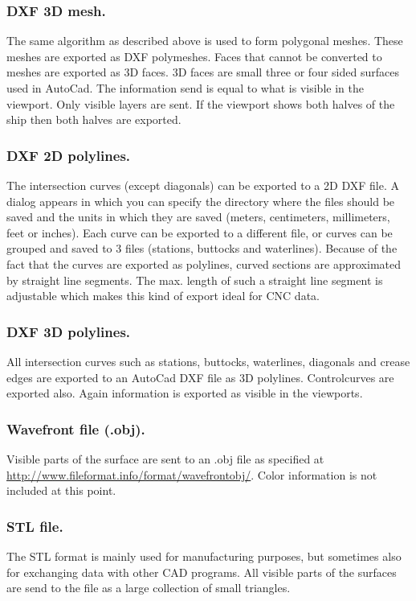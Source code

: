 \documentclass[12pt]{article}
\begin{document}
\subsubsection{DXF 3D mesh.}
The same algorithm as described above is used to form polygonal meshes. These meshes are
exported as DXF polymeshes. Faces that cannot be converted to meshes are exported as 3D
faces. 3D faces are small three or four sided surfaces used in AutoCad. The information send is
equal to what is visible in the viewport. Only visible layers are sent. If the viewport shows both
halves of the ship then both halves are exported.

\subsubsection{DXF 2D polylines.}
The intersection curves (except diagonals) can be exported to a 2D DXF file. A dialog appears in
which you can specify the directory where the files should be saved and the units in which they are
saved (meters, centimeters, millimeters, feet or inches). Each curve can be exported to a different
file, or curves can be grouped and saved to 3 files (stations, buttocks and waterlines). Because of
the fact that the curves are exported as polylines, curved sections are approximated by straight line
segments. The max. length of such a straight line segment is adjustable which makes this kind of
export ideal for CNC data.

\subsubsection{DXF 3D polylines.}
All intersection curves such as stations, buttocks, waterlines,
diagonals and crease edges are exported to an AutoCad DXF file as 3D
polylines. Controlcurves are exported also. Again information is
exported as visible in the viewports.

\subsubsection{Wavefront file (.obj).}
Visible parts of the surface are sent to an .obj file as specified at
\url{http://www.fileformat.info/format/wavefrontobj/}. Color information is not included at this point.

\subsubsection{STL file.}
The STL format is mainly used for manufacturing purposes, but
sometimes also for exchanging data with other CAD programs. All
visible parts of the surfaces are send to the file as a large
collection of small triangles.
\end{document}
